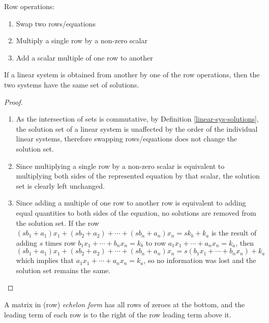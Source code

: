 \begin{defn}\label{row-op}
    Row operations: \begin{enumerate}
        \item Swap two rows/equations
        \item Multiply a single row by a non-zero scalar
        \item Add a scalar multiple of one row to another
    \end{enumerate}
\end{defn}

\begin{thm}\label{solutions-unchanged-by-row-ops}
    If a linear system is obtained from another by one of the row operations, then the two systems have the same set of solutions.
\end{thm}

\begin{proof}\proofbreak
    \begin{enumerate}
        \item As the intersection of sets is commutative, by Definition \ref{linear-sys-solutions}, the solution set of a linear system is unaffected by the order of the individual linear systems, therefore swapping rows/equations does not change the solution set.
        \item Since multiplying a single row by a non-zero scalar is equivalent to multiplying both sides of the represented equation by that scalar, the solution set is clearly left unchanged.
        \item Since adding a multiple of one row to another row is equivalent to adding equal quantities to both sides of the equation, no solutions are removed from the solution set. If the row $(sb_1 + a_1)x_1 + (sb_2 + a_2) + \cdots + (sb_n + a_n)x_n = sk_b + k_a$ is the result of adding $s$ times row $b_1x_1 + \cdots + b_nx_n = k_b$ to row $a_1x_1 + \cdots + a_nx_n = k_a$, then $(sb_1 + a_1)x_1 + (sb_2 + a_2) + \cdots + (sb_n + a_n)x_n = s(b_1x_1 + \cdots + b_nx_n) + k_a$  which implies that $a_1x_1 + \cdots + a_nx_n = k_a$, so no information was lost and the solution set remains the same.
    \end{enumerate}
\end{proof}

\begin{defn}
    A matrix in (row) \emph{echelon form} has all rows of zeroes at the bottom, and the leading term of each row is to the right of the row leading term above it.
\end{defn}

